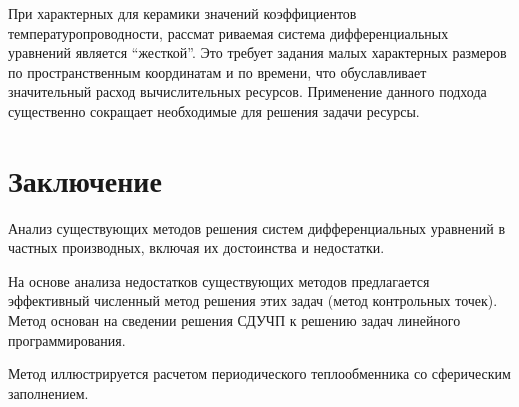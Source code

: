 \documentclass[a4paper,12pt]{article}
\begin{document}
При характерных для керамики значений коэффициентов
температуропроводности, рассмат риваемая система дифференциальных
уравнений является “жесткой”. Это требует задания малых характерных
размеров по пространственным координатам и по времени, что
обуславливает значительный расход вычислительных ресурсов. Применение
данного подхода существенно сокращает необходимые для решения задачи
ресурсы. 

\section{Заключение}

Анализ существующих методов решения систем дифференциальных уравнений
в частных производных, включая их достоинства и недостатки.

На основе анализа недостатков существующих методов предлагается
эффективный численный метод решения этих задач (метод контрольных
точек). Метод основан на сведении решения СДУЧП к решению задач
линейного программирования.

Метод иллюстрируется расчетом периодического теплообменника со
сферическим заполнением.
\end{document}
